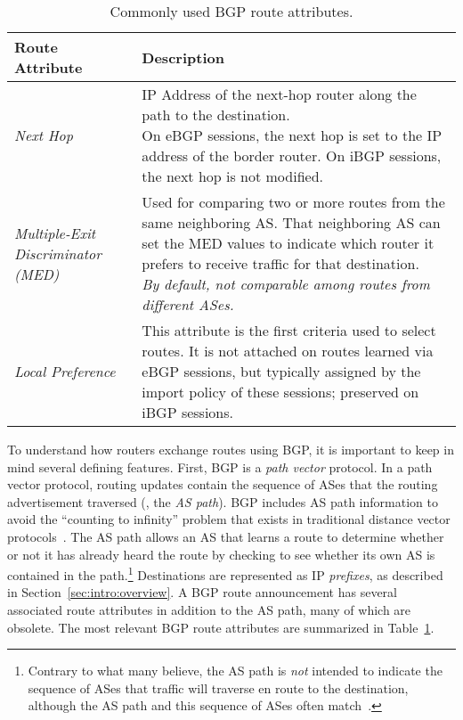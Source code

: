 \begin{table}
\begin{tabular}{l|p{3.45in}}
{\bf Route Attribute} & {\bf Description} \\ \hline
{\em Next Hop} & 
\parbox{3.45in}{
\vspace*{0.05in}
IP Address of the next-hop router along
the path to the destination. \\ On eBGP sessions, the next hop is set to
the IP address of the border router. On iBGP sessions, the next hop
is not modified.
\vspace*{0.05in}
} 
\\ \hline
{\em Multiple-Exit Discriminator (MED)} & 
\parbox{3.45in}{
\vspace*{0.05in}
Used for comparing two or more
routes from the same neighboring AS.  That neighboring AS can set the
MED values to indicate which router it prefers to receive traffic for
that destination. \\ {\em By default, not comparable among routes from
different ASes.}
\vspace*{0.05in}
} 
\\ \hline
{\em Local Preference} & 
\parbox{3.45in}{
\vspace*{0.05in}
This attribute is the first criteria used to
select routes.  It is not attached on routes learned via eBGP sessions,
but typically assigned by the import policy of these sessions;
preserved on iBGP sessions.}
\vspace*{0.03in}
\\ \hline
\end{tabular}
\caption{Commonly used BGP route attributes.}
\label{tab:route_attributes}
\end{table}

To understand how routers exchange routes using BGP, it is important to
keep in mind several defining features.  First, BGP is a {\em
path vector} protocol.  In a path vector protocol, routing updates
contain the sequence of ASes that the routing advertisement traversed
(\ie, the {\em AS path}).  BGP includes AS path information to avoid the
``counting to infinity'' problem that exists in traditional distance
vector protocols~\cite{Halabi2001}.  The AS path allows an AS that
learns a route to determine whether or not it has already heard the
route by checking to see whether its own AS is contained in the
path.\footnote{Contrary to what many believe, the AS path is {\em not}
intended to indicate the sequence of ASes that traffic will traverse en
route to the destination, although the AS path and this sequence of ASes
often match~\cite{Mao2003}.}  Destinations are represented
as IP {\em 
prefixes}, as described in Section~\ref{sec:intro:overview}.  A BGP
route announcement has several associated route attributes in addition
to the AS path, many of which are obsolete.  The most relevant BGP route
attributes are summarized in Table~\ref{tab:route_attributes}.


